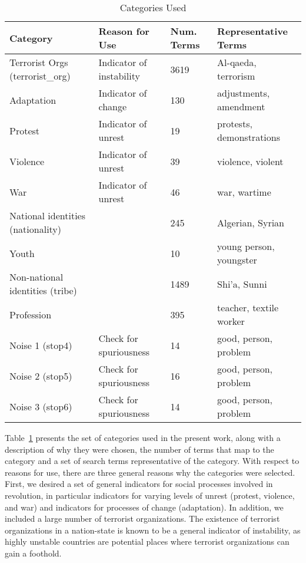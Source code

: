 \begin{table}[ht]
\begin{tabularx}{\textwidth}{| m{3.5cm} | m{4.5cm} | m{1.5cm} | X |}
	\hline 
	{\bf Category} & {\bf Reason for Use} & {\bf Num. Terms} & {\bf Representative Terms} \\ \hline
	  Terrorist Orgs (terrorist\_org) & Indicator of instability & 3619 & Al-qaeda, terrorism \\ \hline
	   Adaptation & Indicator of change & 130 & adjustments,  amendment \\ \hline
      Protest &  Indicator of unrest & 19 & protests, demonstrations \\ \hline
   Violence & Indicator of unrest & 39 & violence, violent \\ \hline
    War & Indicator of unrest & 46 &  war, wartime \\ \hline
    National identities (nationality) & \cite{goldstone_cross-class_2011}& 245 & Algerian, Syrian \\ \hline  
   Youth & \cite{goldstone_cross-class_2011} &   10 & young person, youngster \\ \hline
   Non-national identities (tribe) & \cite{goldstone_cross-class_2011} & 1489 & Shi'a, Sunni \\ \hline
  Profession & \cite{goldstone_cross-class_2011} &  395 & teacher, textile worker \\ \hline
   Noise 1 (stop4) & Check for spuriousness & 14 & good, person, problem  \\ \hline
 Noise 2 (stop5) & Check for spuriousness & 16 & good, person, problem \\ \hline
 Noise 3 (stop6) & Check for spuriousness & 14 & good, person, problem\\ \hline
\end{tabularx}
	\caption{Categories Used}
	\label{tab:categories}
\end{table}

Table~\ref{tab:categories} presents the set of categories used in the present work, along with a description of why they were chosen, the number of terms that map to the category and a set of search terms representative of the category.  With respect to reasons for use, there are three general reasons why the categories were selected. First, we desired a set of general indicators for social processes involved in revolution, in particular indicators for varying levels of unrest (protest, violence, and war) and indicators for processes of change (adaptation).  In addition, we included a large number of terrorist organizations.  The existence of terrorist organizations in a nation-state is known to be a general indicator of instability, as highly unstable countries are potential places where terrorist organizations can gain a foothold.  

